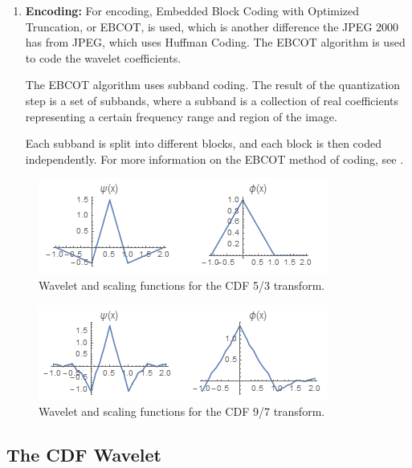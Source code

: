 \documentclass[titlepage,12pt]{article}
\begin{document}
\begin{enumerate}
	\item\textbf{Encoding:}
	For encoding, Embedded Block Coding with Optimized Truncation, or EBCOT, is used,
	which is another difference the JPEG 2000 has from JPEG, 
	which uses Huffman Coding.
	The EBCOT algorithm is used to code the wavelet coefficients.
	
	The EBCOT algorithm uses subband coding.
	The result of the quantization step is a set of subbands, 
	where a subband is a collection of real coefficients representing a certain
	frequency range and region of the image.
	
	Each subband is split into different blocks,
	and each block is then coded independently.\cite{hp}
	For more information on the EBCOT method of coding, 
	see \cite{ebcot}.
	
\end{enumerate}

\begin{figure}[h]
	\centering
	\includegraphics[scale=0.9]{resources/lossless_family.png}
	\caption{Wavelet and scaling functions for the CDF 5/3 transform.}
	\label{fig:lossless_family}
\end{figure}

\begin{figure}[h]
	\centering
	\includegraphics[scale=0.9]{resources/lossy_family.png}
	\caption{Wavelet and scaling functions for the CDF 9/7 transform.}
	\label{fig:lossy_family}
\end{figure}

\subsection{The CDF Wavelet}
\end{document}
